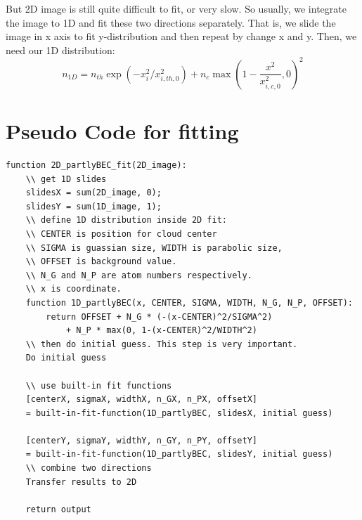 \documentclass[11pt]{article} %
\begin{document}
But 2D image is still quite difficult to fit, or very slow.
So usually, we integrate the image to 1D and fit these two directions separately.
That is, we slide the image in x axis to fit y-distribution and then repeat by change x and y.
Then, we need our 1D distribution:
\begin{equation}
n_{1D} = n_{th}\exp(-x_i^2/x_{i,th,0}^2) + n_c\max(1-\frac{x^2}{x_{i,c,0}^2}, 0)^{2}
\end{equation}

\section{Pseudo Code for fitting}
\begin{lstlisting}
function 2D_partlyBEC_fit(2D_image):
	\\ get 1D slides
	slidesX = sum(2D_image, 0);
	slidesY = sum(1D_image, 1);
	\\ define 1D distribution inside 2D fit:
	\\ CENTER is position for cloud center
	\\ SIGMA is guassian size, WIDTH is parabolic size, 
	\\ OFFSET is background value. 
	\\ N_G and N_P are atom numbers respectively. 
	\\ x is coordinate.
	function 1D_partlyBEC(x, CENTER, SIGMA, WIDTH, N_G, N_P, OFFSET):
		return OFFSET + N_G * (-(x-CENTER)^2/SIGMA^2)
			+ N_P * max(0, 1-(x-CENTER)^2/WIDTH^2)
	\\ then do initial guess. This step is very important.
	Do initial guess

	\\ use built-in fit functions
	[centerX, sigmaX, widthX, n_GX, n_PX, offsetX] 
	= built-in-fit-function(1D_partlyBEC, slidesX, initial guess)

	[centerY, sigmaY, widthY, n_GY, n_PY, offsetY] 
	= built-in-fit-function(1D_partlyBEC, slidesY, initial guess)
	\\ combine two directions
	Transfer results to 2D

	return output
\end{lstlisting}
\end{document}
